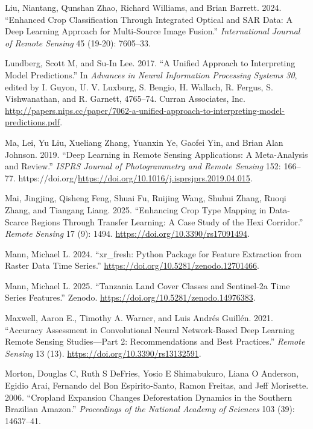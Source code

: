 \documentclass[
  journal,
  twocolumn]{IEEEtran}
\newlength{\cslhangindent}
\newlength{\cslentryspacingunit} %
\newenvironment{CSLReferences}[2] %
 {%
  \setlength{\parindent}{0pt}
  \ifodd #1
  \let\oldpar\par
  \def\par{\hangindent=\cslhangindent\oldpar}
  \fi
  \setlength{\parskip}{#2\cslentryspacingunit}
 }%
 {}
\begin{document}
\begin{CSLReferences}{1}{0}
\leavevmode{}%
Liu, Niantang, Qunshan Zhao, Richard Williams, and Brian Barrett. 2024.
{``Enhanced Crop Classification Through Integrated Optical and SAR Data:
A Deep Learning Approach for Multi-Source Image Fusion.''}
\emph{International Journal of Remote Sensing} 45 (19-20): 7605--33.

\leavevmode{}%
Lundberg, Scott M, and Su-In Lee. 2017. {``A Unified Approach to
Interpreting Model Predictions.''} In \emph{Advances in Neural
Information Processing Systems 30}, edited by I. Guyon, U. V. Luxburg,
S. Bengio, H. Wallach, R. Fergus, S. Vishwanathan, and R. Garnett,
4765--74. Curran Associates, Inc.
\url{http://papers.nips.cc/paper/7062-a-unified-approach-to-interpreting-model-predictions.pdf}.

\leavevmode{}%
Ma, Lei, Yu Liu, Xueliang Zhang, Yuanxin Ye, Gaofei Yin, and Brian Alan
Johnson. 2019. {``Deep Learning in Remote Sensing Applications: A
Meta-Analysis and Review.''} \emph{ISPRS Journal of Photogrammetry and
Remote Sensing} 152: 166--77.
https://doi.org/\url{https://doi.org/10.1016/j.isprsjprs.2019.04.015}.

\leavevmode{}%
Mai, Jingjing, Qisheng Feng, Shuai Fu, Ruijing Wang, Shuhui Zhang, Ruoqi
Zhang, and Tiangang Liang. 2025. {``Enhancing Crop Type Mapping in
Data-Scarce Regions Through Transfer Learning: A Case Study of the Hexi
Corridor.''} \emph{Remote Sensing} 17 (9): 1494.
\url{https://doi.org/10.3390/rs17091494}.

\leavevmode{}%
Mann, Michael L. 2024. {``{xr\_fresh: Python Package for Feature
Extraction from Raster Data Time Series}.''}
\url{https://doi.org/10.5281/zenodo.12701466}.

\leavevmode{}%
Mann, Michael L. 2025. {``Tanzania Land Cover Classes and {Sentinel-2a}
Time Series Features.''} Zenodo.
\url{https://doi.org/10.5281/zenodo.14976383}.

\leavevmode{}%
Maxwell, Aaron E., Timothy A. Warner, and Luis Andrés Guillén. 2021.
{``Accuracy Assessment in Convolutional Neural Network-Based Deep
Learning Remote Sensing Studies---Part 2: Recommendations and Best
Practices.''} \emph{Remote Sensing} 13 (13).
\url{https://doi.org/10.3390/rs13132591}.

\leavevmode{}%
Morton, Douglas C, Ruth S DeFries, Yosio E Shimabukuro, Liana O
Anderson, Egidio Arai, Fernando del Bon Espirito-Santo, Ramon Freitas,
and Jeff Morisette. 2006. {``Cropland Expansion Changes Deforestation
Dynamics in the Southern Brazilian Amazon.''} \emph{Proceedings of the
National Academy of Sciences} 103 (39): 14637--41.


\end{CSLReferences}
\end{document}
